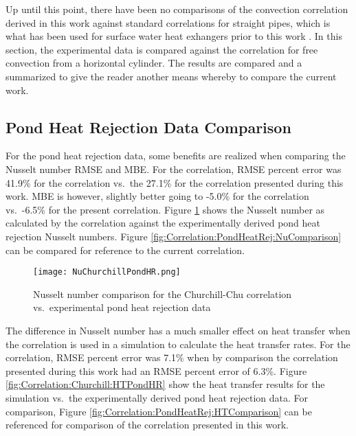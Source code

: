 Up until this point, there have been no comparisons of the convection correlation derived in this work against standard correlations for straight pipes, which is what has  been used for surface water heat exhangers prior to this work \citep{Chiasson1999}. In this section, the experimental data is compared against the \cite{ChurchillChu1975} correlation for free convection from a horizontal cylinder. The results are compared and a summarized to give the reader another means whereby to compare the current work.

\subsection{Pond Heat Rejection Data Comparison}
\label{Correlation:Churchill:PondHR}

For the pond heat rejection data, some benefits are realized when comparing the Nusselt number RMSE and MBE. For the \cite{ChurchillChu1975} correlation, RMSE percent error was 41.9\% for the \cite{ChurchillChu1975} correlation vs.\ the 27.1\% for the correlation presented during this work. MBE is however, slightly better going to -5.0\% for the \cite{ChurchillChu1975} correlation vs.\ -6.5\% for the present correlation. Figure \ref{fig:Correlation:Churchill:NuPondHR} shows the Nusselt number as calculated by the \cite{ChurchillChu1975} correlation against the experimentally derived pond heat rejection Nusselt numbers. Figure \ref{fig:Correlation:PondHeatRej:NuComparison} can be compared for reference to the current correlation.

\begin{figure}
	\centering
	\texttt{[image: NuChurchillPondHR.png]}
	\caption{Nusselt number comparison for the Churchill-Chu correlation vs.\ experimental pond heat rejection data}
	\label{fig:Correlation:Churchill:NuPondHR}
\end{figure}

The difference in Nusselt number has a much smaller effect on heat transfer when the \cite{ChurchillChu1975} correlation is used in a simulation to calculate the heat transfer rates. For the \cite{ChurchillChu1975} correlation, RMSE percent error was 7.1\% when by comparison the correlation presented during this work had an RMSE percent error of 6.3\%. Figure \ref{fig:Correlation:Churchill:HTPondHR} show the heat transfer results for the simulation vs.\ the experimentally derived pond heat rejection data. For comparison, Figure \ref{fig:Correlation:PondHeatRej:HTComparison} can be referenced for comparison of the correlation presented in this work.

